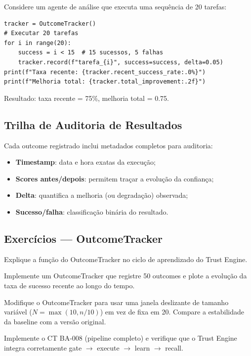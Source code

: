 \begin{exemplo}
Considere um agente de análise que executa uma sequência de 20 tarefas:
\begin{lstlisting}[style=pythonstyle]
tracker = OutcomeTracker()
# Executar 20 tarefas
for i in range(20):
    success = i < 15  # 15 sucessos, 5 falhas
    tracker.record(f"tarefa_{i}", success=success, delta=0.05)
print(f"Taxa recente: {tracker.recent_success_rate:.0%}")
print(f"Melhoria total: {tracker.total_improvement:.2f}")
\end{lstlisting}
Resultado: taxa recente = 75\%, melhoria total = 0.75.
\end{exemplo}

\subsection{Trilha de Auditoria de Resultados}

Cada outcome registrado inclui metadados completos para auditoria:

\begin{itemize}
\item \textbf{Timestamp}: data e hora exatas da execução;
\item \textbf{Scores antes/depois}: permitem traçar a evolução da
confiança;
\item \textbf{Delta}: quantifica a melhoria (ou degradação) observada;
\item \textbf{Sucesso/falha}: classificação binária do resultado.
\end{itemize}

\subsection{Exercícios — OutcomeTracker}
\begin{exercicio}
Explique a função do OutcomeTracker no ciclo de aprendizado do Trust
Engine.
\end{exercicio}
\begin{exercicio}
Implemente um OutcomeTracker que registre 50 outcomes e plote a
evolução da taxa de sucesso recente ao longo do tempo.
\end{exercicio}
\begin{exercicio}
Modifique o OutcomeTracker para usar uma janela deslizante de tamanho
variável ($N = \max(10, n/10)$) em vez de fixa em 20. Compare a
estabilidade da baseline com a versão original.
\end{exercicio}
\begin{exercicio}
Implemente o CT BA-008 (pipeline completo) e verifique que o Trust
Engine integra corretamente gate $\to$ execute $\to$ learn $\to$
recall.
\end{exercicio}

